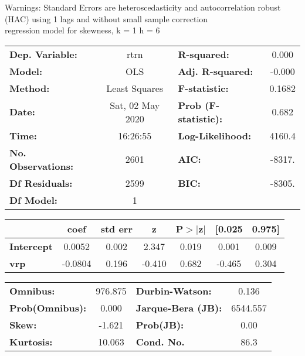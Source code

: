 Warnings: \newline
 [1] Standard Errors are heteroscedasticity and autocorrelation robust (HAC) using 1 lags and without small sample correction\\ 

regression model for skewness, k = 1 h = 6\begin{center}
\begin{tabular}{lclc}
\toprule
\textbf{Dep. Variable:}    &       rtrn       & \textbf{  R-squared:         } &     0.000   \\
\textbf{Model:}            &       OLS        & \textbf{  Adj. R-squared:    } &    -0.000   \\
\textbf{Method:}           &  Least Squares   & \textbf{  F-statistic:       } &    0.1682   \\
\textbf{Date:}             & Sat, 02 May 2020 & \textbf{  Prob (F-statistic):} &    0.682    \\
\textbf{Time:}             &     16:26:55     & \textbf{  Log-Likelihood:    } &    4160.4   \\
\textbf{No. Observations:} &        2601      & \textbf{  AIC:               } &    -8317.   \\
\textbf{Df Residuals:}     &        2599      & \textbf{  BIC:               } &    -8305.   \\
\textbf{Df Model:}         &           1      & \textbf{                     } &             \\
\bottomrule
\end{tabular}
\begin{tabular}{lcccccc}
                   & \textbf{coef} & \textbf{std err} & \textbf{z} & \textbf{P$> |$z$|$} & \textbf{[0.025} & \textbf{0.975]}  \\
\midrule
\textbf{Intercept} &       0.0052  &        0.002     &     2.347  &         0.019        &        0.001    &        0.009     \\
\textbf{vrp}       &      -0.0804  &        0.196     &    -0.410  &         0.682        &       -0.465    &        0.304     \\
\bottomrule
\end{tabular}
\begin{tabular}{lclc}
\textbf{Omnibus:}       & 976.875 & \textbf{  Durbin-Watson:     } &    0.136  \\
\textbf{Prob(Omnibus):} &   0.000 & \textbf{  Jarque-Bera (JB):  } & 6544.557  \\
\textbf{Skew:}          &  -1.621 & \textbf{  Prob(JB):          } &     0.00  \\
\textbf{Kurtosis:}      &  10.063 & \textbf{  Cond. No.          } &     86.3  \\
\bottomrule
\end{tabular}
\end{center}

